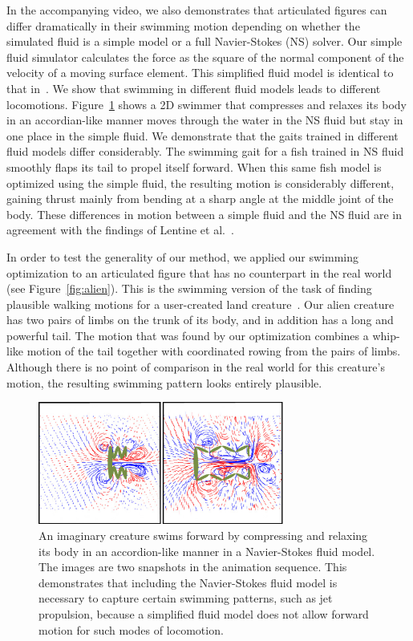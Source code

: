 In the accompanying video, we also demonstrates that articulated figures
can differ dramatically in their swimming motion depending on whether the
simulated fluid is a simple model or a full Navier-Stokes (NS) solver.
Our simple fluid simulator calculates the force as the square of the
normal component of the velocity of a moving surface element.  This
simplified fluid model is identical to that
in~\cite{Wu:2003,lentine2010creature}.  We show that swimming in
different fluid models leads to different locomotions. Figure~\ref{fig:accordian} shows a 2D swimmer that
compresses and relaxes its body in an accordian-like manner moves through
the water in the NS fluid but stay in one place in the simple fluid. We
demonstrate that the gaits trained in different fluid models differ
considerably.  The swimming gait for a fish trained in NS fluid smoothly
flaps its tail to propel itself forward.  When this same fish model is
optimized using the simple fluid, the resulting motion is considerably
different, gaining thrust mainly from bending at a sharp angle at the
middle joint of the body.  These differences in motion between a simple
fluid and the NS fluid are in agreement with the findings of Lentine et
al.~\cite{lentine2010creature}.

In order to test the generality of our method, we applied our swimming
optimization to an articulated figure that has no counterpart in the real
world (see Figure~\ref{fig:alien}).  This is the swimming version of the task of finding plausible walking
motions for a user-created land
creature~\cite{hecker2008real,wampler2009optimal}.  Our alien creature has two
pairs of limbs on the trunk of its body, and in addition has a long and
powerful tail.  The motion that was found by our optimization combines a
whip-like motion of the tail together with coordinated rowing from the pairs of
limbs.  Although there is no point of comparison in the real world for this
creature's motion, the resulting swimming pattern looks entirely plausible.

\begin{figure}[!b]
\centering
\includegraphics[width=3.2in]{figures/accordian.eps}
\caption{An imaginary creature swims forward by compressing and relaxing its body in an accordion-like manner in a Navier-Stokes fluid model. The images are two snapshots in the animation sequence. This demonstrates that including the Navier-Stokes fluid model is necessary to capture certain swimming patterns, such as jet propulsion, because a simplified fluid model does not allow forward motion for such modes of locomotion.}
\label{fig:accordian}
\end{figure}


